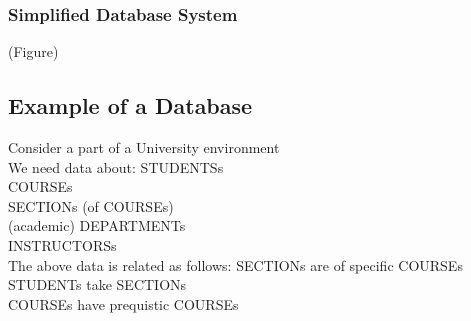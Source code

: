 \subsubsection{Simplified Database System}

(Figure)

\subsection{Example of a Database}

Consider a part of a University environment\\

We need data about:
    STUDENTSs\\
    COURSEs\\
    SECTIONs (of COURSEs)\\
    (academic) DEPARTMENTs\\
    INSTRUCTORSs\\

The above data is related as follows:
    SECTIONs are of specific COURSEs\\
    STUDENTs take SECTIONs\\
    COURSEs have prequistic COURSEs\\
